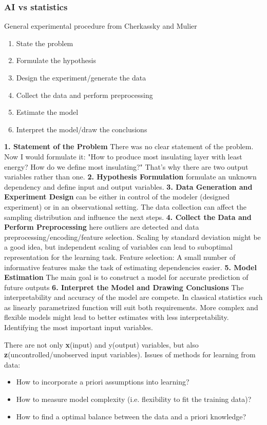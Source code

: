 \subsubsection{AI vs statistics}
General experimental procedure from Cherkassky and Mulier\cite{cherkassky1998learning}
\begin{enumerate}
	\item State the problem 
	\item Formulate the hypothesis
	\item Design the experiment/generate the data
	\item Collect the data and perform preprocessing
	\item Estimate the model 
	\item Interpret the model/draw the conclusions
\end{enumerate}
\textbf{1. Statement of the Problem} There was no clear statement of the problem. Now I would formulate it: "How to produce most insulating layer with least energy? How do we define most insulating?" That's why there are two output variables rather than one.
\textbf{2. Hypothesis Formulation} formulate an unknown dependency and define input and output variables.
\textbf{3. Data Generation and Experiment Design} can be either in control of the modeler (designed experiment) or in an observational setting. The data collection can affect the sampling distribution and influence the next steps. 
\textbf{4. Collect the Data and Perform Preprocessing} here outliers are detected and data preprocessing/encoding/feature selection. Scaling by standard deviation might be a good idea, but independent scaling of variables can lead to suboptimal representation for the learning task. Feature selection: A small number of informative features make the task of estimating dependencies easier. 
\textbf{5. Model Estimation} The main goal is to construct a model for accurate prediction of future outputs
\textbf{6. Interpret the Model and Drawing Conclusions} The interpretability and accuracy of the model are compete. In classical statistics such as linearly parametrized function will suit both requirements. More complex and flexible models might lead to better estimates with less interpretability. Identifying the most important input variables. 

There are not only \textbf{x}(input) and y(output) variables, but also \textbf{z}(uncontrolled/unobserved input variables).
Issues of methods for learning from data: 
\begin{itemize}
	\item How to incorporate a priori assumptions into learning? 
	\item How to measure model complexity (i.e. flexibility to fit the training data)?
	\item How to find a optimal balance between the data and a priori knowledge? 
\end{itemize}

